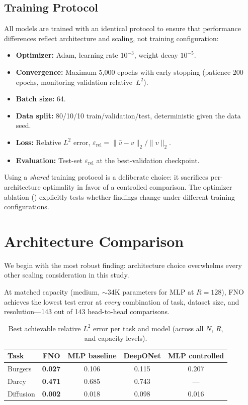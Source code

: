 \documentclass[11pt]{article}
\newcommand{\relLtwo}{\varepsilon_{\mathrm{rel}}}
\begin{document}
\subsection{Training Protocol}
\label{sec:training}

All models are trained with an identical protocol to ensure that
performance differences reflect architecture and scaling, not training
configuration:

\begin{itemize}[leftmargin=*,itemsep=2pt]
  \item \textbf{Optimizer:} Adam, learning rate $10^{-3}$, weight
    decay $10^{-5}$.
  \item \textbf{Convergence:} Maximum 5{,}000 epochs with early
    stopping (patience 200 epochs, monitoring validation
    relative~$L^2$).
  \item \textbf{Batch size:} 64.
  \item \textbf{Data split:} 80/10/10 train/validation/test,
    deterministic given the data seed.
  \item \textbf{Loss:} Relative $L^2$ error,
    $\relLtwo = \|\hat{v} - v\|_2 / \|v\|_2$.
  \item \textbf{Evaluation:} Test-set $\relLtwo$ at the
    best-validation checkpoint.
\end{itemize}

\noindent
Using a \emph{shared} training protocol is a deliberate choice:
it sacrifices per-architecture optimality in favor of a controlled
comparison. The optimizer ablation
() explicitly tests whether findings change
under different training configurations.


\section{Architecture Comparison}
\label{sec:architecture}

We begin with the most robust finding: architecture choice overwhelms
every other scaling consideration in this study.

At matched capacity (medium, $\sim$34K parameters for MLP at
$R = 128$), FNO achieves the lowest test error at \emph{every}
combination of task, dataset size, and resolution---143 out of 143
head-to-head comparisons.

\begin{table}[h]
\centering
\caption{Best achievable relative $L^2$ error per task and model
(across all $N$, $R$, and capacity levels).}
\label{tab:best-error}
\begin{tabular}{@{}lcccc@{}}
\toprule
\textbf{Task} & \textbf{FNO} & \textbf{MLP baseline} &
\textbf{DeepONet} & \textbf{MLP controlled} \\
\midrule
Burgers   & \textbf{0.027} & 0.106 & 0.115 & 0.207 \\
Darcy     & \textbf{0.471} & 0.685 & 0.743 & --- \\
Diffusion & \textbf{0.002} & 0.018 & 0.098 & 0.016 \\
\bottomrule
\end{tabular}
\end{table}
\end{document}
